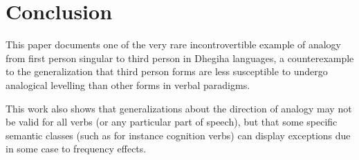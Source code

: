 \documentclass[oneside,a4paper,11pt]{article}
\begin{document}
\section{Conclusion}
This paper documents one of the very rare incontrovertible example of analogy from first person singular to third person in Dhegiha languages, a counterexample to the generalization that third person forms are less susceptible to undergo analogical levelling than other forms in verbal paradigms.
 
This work also shows that generalizations about the direction of analogy may not be valid for all verbs (or any particular part of speech), but that some specific semantic classes (such as for instance cognition verbs) can display exceptions due in some case to frequency effects. 
 



 \tableofcontents
\end{document}
